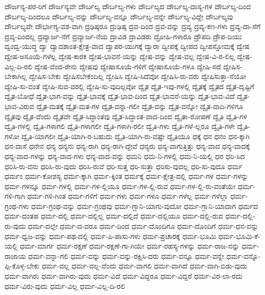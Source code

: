 {ದೌರ್ಜನ್ಯ-ಪರ-ರಿಗೆ
ದೌರ್ಜನ್ಯವೇ
ದೌರ್ಬಲ್ಯ
ದೌರ್ಬಲ್ಯ-ಗಳು
ದೌರ್ಬಲ್ಯದ
ದೌರ್ಬಲ್ಯ-ದಾಸ್ಯ-ಗಳ
ದೌರ್ಬಲ್ಯ-ದಿಂದ
ದೌರ್ಬಲ್ಯ-ದಿಂದಲೂ
ದೌರ್ಬಲ್ಯ-ವನ್ನು
ದೌರ್ಬಲ್ಯ-ವನ್ನೂ
ದೌರ್ಬಲ್ಯ-ವನ್ನೇ
ದೌರ್ಬಲ್ಯ-ವಿದ್ದೇ
ದೌರ್ಬಲ್ಯವು
ದೌರ್ಬಲ್ಯವೇ
ದೌರ್ಭಾಗ್ಯ-ವಶ-ವಾಗಿ
ದ್ರಢಿಷ್ಠರೂ
ದ್ರುಢಿಷ್ಠ
ದ್ರವ-ದಿಂದ
ದ್ರವ-ವನ್ನು
ದ್ರವ್ಯ
ದ್ರವ್ಯ-ಕಣ-ಗಳು
ದ್ರವ್ಯ-ದಾ-ಸೆಗೆ
ದ್ರವ್ಯ-ದಿಂದಲ್ಲ
ದ್ರವ್ಯಾರ್ಜ-ನೆಗೆ
ದ್ರವ್ಯಾರ್ಜ-ನೆಯ
ದ್ರಾವಿಡ
ದ್ರಾವಿಡರು
ದ್ರೋಹಿ-ಗಳಾರೂ
ದ್ರೌಪದಿ
ದ್ರೌಪ-ದಿಯು
ದ್ವಂದ್ವ-ಯುದ್ಧ
ದ್ವಾ
ದ್ವಾದಶಾಂತ-ಕ್ಷೇತ್ರ-ವಾದ
ದ್ವಾಪರ-ಯುಗಕ್ಕೆ
ದ್ವಾರಾ
ದ್ವೀಪಕ್ಕೆ
ದ್ವೀಪದ
ದ್ವೀಪಸ್ತೋಮಕ್ಕೆ
ದ್ವೇಷ
ದ್ವೇಷ-ಅಸೂಯೆ-ಗಳೆಲ್ಲ
ದ್ವೇಷ-ಕಾರಕ
ದ್ವೇಷ-ಭಾವನೆ-ಯನ್ನು
ದ್ವೇಷ-ವನ್ನು
ದ್ವೇಷ-ವಲ್ಲ
ದ್ವೇಷ-ವಿ-ರ-ಲಿಲ್ಲ
ದ್ವೇಷ-ವಿಲ್ಲ-ದಿ-ರಲಿ
ದ್ವೇಷ-ವೆಂದ-ರೇನು
ದ್ವೇಷವು
ದ್ವೇಷಾಸೂಯೆ-ಗಳಿಗೆ
ದ್ವೇಷಾಸೂಯೆ-ಗಳೂ
ದ್ವೇಷಿ-ಸದೆ
ದ್ವೇಷಿಸ-ಬೇಕಾಗಿಲ್ಲ
ದ್ವೇಷಿಸ-ಬೇಕು
ದ್ವೇಷಿಸಬೇಕೆಂದಿಲ್ಲ
ದ್ವೇಷಿಸಿ
ದ್ವೇಷಿ-ಸಿದೆವೋ
ದ್ವೇಷಿಸಿ-ರು-ವರು
ದ್ವೇಷಿಸುತ್ತಾ-ನೆಯೋ
ದ್ವೇಷಿ-ಸು-ವಂತೆ
ದ್ವೇಷಿ-ಸುವ-ವರಲ್ಲಿ
ದ್ವೇಷಿ-ಸು-ವುದಿಲ್ಲವೋ
ದ್ವೈತ
ದ್ವೈತ-ಇವು-ಗಳಲ್ಲಿ
ದ್ವೈತಕ್ಕೆ
ದ್ವೈತದ
ದ್ವೈತ-ದೃಷ್ಟಿಗೆ
ದ್ವೈತ-ಬೋಧೆ
ದ್ವೈತ-ಭಾಗ-ವನ್ನು
ದ್ವೈತ-ಭಾವಕ್ಕೆ
ದ್ವೈತ-ಭಾವ-ದಿಂದ
ದ್ವೈತ-ಭಾವನೆ-ಯನ್ನು
ದ್ವೈತ-ಭಾವ-ವಿದೆ
ದ್ವೈತ-ಭಾವ-ವಿರುವ
ದ್ವೈತ-ಮತಕ್ಕೆ
ದ್ವೈತ-ಮತ-ಗಳ
ದ್ವೈತ-ವನ್ನಾ-ಗಲೀ
ದ್ವೈತ-ವನ್ನು
ದ್ವೈತ-ವನ್ನೋ
ದ್ವೈತ-ವಾದಿ-ಗಳಿಗೂ
ದ್ವೈತವು
ದ್ವೈತ-ವೆಂದು
ದ್ವೈತವೇ
ದ್ವೈತ-ಸಿದ್ಧಾಂತವು
ದ್ವೈತ-ಸಿದ್ಧಾಂತ-ವಾದ-ದಿಂದ
ದ್ವೈತಾ-ರೋಪಣೆ
ದ್ವೈತಿ
ದ್ವೈತಿ-ಗಳ
ದ್ವೈತಿ-ಗಳಲ್ಲಿ
ದ್ವೈತಿ-ಗಳಾಗಲಿ
ದ್ವೈತಿ-ಗಳಾಗಲೀ
ದ್ವೈತಿ-ಗಳಾಗಿ-ರಲೀ
ದ್ವೈತಿ-ಗಳು
ದ್ವೈತಿ-ಗಳೆ-ಲ್ಲರೂ
ದ್ವೈತಿ-ಗಳೇ
ದ್ವೈತಿ-ಗಳೋ
ದ್ವೈತಿ-ಯಾಗಲೀ
ದ್ವೈತಿ-ಯಾಗಿ-ರ-ಬಹುದು
ದ್ವೈತಿ-ಯಾಗಿ-ರು-ವಷ್ಟೇ
ದ್ವೈತಿಯೂ
ಧಕ್ಕೆ
ಧನ
ಧನಂ
ಧನ-ಕ್ಕಾಗಿ
ಧನ-ದಾಸೆ
ಧನೇನ
ಧನ್ಯ
ಧನ್ಯನು
ಧನ್ಯ-ರಾಗಿ
ಧನ್ಯ-ರಾಗಿ-ದ್ದೇವೆ
ಧನ್ಯರು
ಧನ್ಯ-ವಾಗುತ್ತಿತ್ತು
ಧನ್ಯ-ವಾದ
ಧನ್ಯ-ವಾದಕ್ಕೆ
ಧನ್ಯ-ವಾದ-ಗಳನ್ನು
ಧನ್ಯ-ವಾದ-ಗಳು
ಧನ್ಯ-ವಾದ-ವನ್ನು
ಧಮನಿ
ಧಮ-ನಿ-ಗಳಲ್ಲಿ
ಧಮ-ನಿ-ಯಲ್ಲಿ
ಧರ
ಧರಿ-ಸಿದ
ಧರಿಸಿ-ರು-ವನು
ಧರಿಸಿ-ರು-ವುದು
ಧರಿಸಿ-ರುವೆ
ಧರಿ-ಸುತ್ತ
ಧರಿ-ಸುತ್ತಾ
ಧರಿಸು-ವುದಲ್ಲ
ಧರಿ-ಸು-ವುದೂ
ಧರ್ಮ
ಧರ್ಮಂ
ಧರ್ಮ-ಕೋಶಸ್ಯ
ಧರ್ಮ-ಕ್ಕಾಗಿ
ಧರ್ಮ-ಕ್ಕಿಂತ
ಧರ್ಮಕ್ಕೆ
ಧರ್ಮ-ಕ್ಷೇತ್ರ-ದಲ್ಲಿ
ಧರ್ಮ-ಗಳ
ಧರ್ಮ-ಗಳನ್ನು
ಧರ್ಮ-ಗಳನ್ನೂ
ಧರ್ಮ-ಗಳಲ್ಲಿ
ಧರ್ಮ-ಗಳ-ಲ್ಲಿಯೂ
ಧರ್ಮ-ಗಳ-ಲ್ಲಿ-ರುವ
ಧರ್ಮ-ಗಳ-ಲ್ಲಿ-ರು-ವಂತೆಯೇ
ಧರ್ಮ-ಗಳಿ-ಗಾಗಿ
ಧರ್ಮ-ಗಳಿ-ಗಿಂತ
ಧರ್ಮ-ಗಳಿಗೆ
ಧರ್ಮ-ಗಳು
ಧರ್ಮ-ಗಳೂ
ಧರ್ಮ-ಗಳೆಲ್ಲ
ಧರ್ಮ-ಗಳೆಲ್ಲಾ
ಧರ್ಮ-ಗ್ರಂಥ-ಗಳು
ಧರ್ಮ-ಗ್ರಂಥ-ವನ್ನು
ಧರ್ಮ-ಗ್ರಂಥವು
ಧರ್ಮ-ಗ್ಲಾನಿ-ಯಾಗು-ವುದೋ
ಧರ್ಮ-ಗ್ಲಾನಿ-ಯಾದಾಗ
ಧರ್ಮದ
ಧರ್ಮ-ದಂತಹ
ಧರ್ಮ-ದಲ್ಲಿ
ಧರ್ಮ-ದಲ್ಲಿಲ್ಲ
ಧರ್ಮ-ದಲ್ಲಿದೆ
ಧರ್ಮ-ದಲ್ಲಿಯೂ
ಧರ್ಮ-ದಲ್ಲಿ-ರುವ
ಧರ್ಮ-ದಲ್ಲಿ-ರು-ವುದು
ಧರ್ಮ-ದಲ್ಲೇ
ಧರ್ಮ-ದ-ವರೂ
ಧರ್ಮ-ದಿಂದ
ಧರ್ಮ-ದೊಂದಿಗೂ
ಧರ್ಮ-ದೊಂದಿಗೆ
ಧರ್ಮ-ಧನ-ವನ್ನು
ಧರ್ಮ-ಧ್ವಜ-ವನ್ನು
ಧರ್ಮ-ಪಥ-ದಲ್ಲಿ
ಧರ್ಮ-ಪಿ-ಪಾಸು-ಗಳು
ಧರ್ಮ-ಪ್ರಚಾರಕ್ಕೆ
ಧರ್ಮ-ಭೂಮಿ
ಧರ್ಮ-ಭೂಮಿ-ಕೆ-ಯಲ್ಲಿ
ಧರ್ಮ-ಮಾರ್ಗ
ಧರ್ಮ-ರಕ್ಷಣೆ
ಧರ್ಮ-ರಕ್ಷಣೆ-ಗಾ-ಗಿಯೇ
ಧರ್ಮ-ರಹಸ್ಯ-ಗಳನ್ನು
ಧರ್ಮ-ರಾಜ-ನನ್ನು
ಧರ್ಮ-ರಾಜಾಯ
ಧರ್ಮ-ವನ್ನಾ-ಗಲಿ
ಧರ್ಮ-ವನ್ನು
ಧರ್ಮ-ವನ್ನು-ರಕ್ಷಿಸಿ-ದರು
ಧರ್ಮ-ವನ್ನೂ
ಧರ್ಮ-ವನ್ನೇ
ಧರ್ಮ-ವನ್ನೊ-ಪ್ಪಿ-ಕೊಳ್ಳ-ಬೇಕು
ಧರ್ಮ-ವಲ್ಲ
ಧರ್ಮ-ವಲ್ಲ-ವೆಂದು
ಧರ್ಮ-ವಾಗಲಿ
ಧರ್ಮ-ವಾಗಿದೆ
ಧರ್ಮ-ವಾಗಿ-ಬಿಡು-ವುದು
ಧರ್ಮ-ವಾಗಿರು
ಧರ್ಮ-ವಾಗಿರು-ವುದು
ಧರ್ಮ-ವಿದೆ
ಧರ್ಮ-ವಿದ್ದರೂ
ಧರ್ಮ-ವಿದ್ದರೆ
ಧರ್ಮ-ವಿರ-ಲಾ-ರದು
ಧರ್ಮ-ವಿರು-ವುದು
ಧರ್ಮ-ವಿಲ್ಲ
ಧರ್ಮ-ವಿಲ್ಲ-ದಿ-ರಲಿ
}
